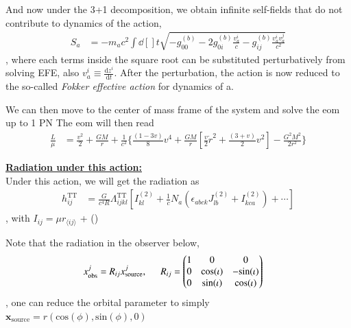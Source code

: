 \documentclass[a4paper, 12pt]{article}
\begin{document}
    And now under the 3+1 decomposition, we obtain infinite self-fields
    that do not contribute to dynamics of the action, 
    \begin{align}
      \label{dynamics of action}
      S_a &= - m_a c^{2} \int \dd[]{t} \sqrt{- g_{00}^{(b)} - 2
      g_{0i}^{(b)} \frac{v_{a}^{i}}{c} - g_{ij}^{(b)}
      \frac{v_{a}^{i} v_{a}^{j}}{c^2}}  
    \end{align}, where each terms inside the square root can be
    substituted 
    perturbatively from solving EFE, also \( v_{a}^{i} \equiv
    \frac{\mathrm{d}z^{i} }{\mathrm{d}t} \). 
    After the perturbation, the action is now reduced to the so-called
    \textit{Fokker effective action} for dynamics of a.
   
   We can then move to the center of mass frame of the system and solve
   the eom up to 1 PN 
   The eom will then read 
   \begin{align}
    \label{eom with fokker effective action}
    \frac{L}{\mu} &=  \frac{v^2}{2} + \frac{GM}{r} +
     \frac{1}{c^2} \bigg\{ \frac{(1-3v)}{8}v^4 + \frac{GM}{r}
     [\frac{v}{2} \dot{r}^{2} + \frac{(3+v)}{2}v^2 ] -
     \frac{G^2 M^2}{2 r^2}  \bigg\} 
   \end{align}

   \textbf{\underline{Radiation under this action:}}\\
   Under this action, we will get the radiation as 
   \begin{align}
    \label{radiation under fokker}
    h_{ij}^{\mathrm{TT}} &= \frac{G}{c^4 R}
     \Lambda_{ijkl}^{\mathrm{TT}} [ I_{kl}^{(2)} + \frac{1}{c} N_{a} (
     \epsilon_{abck} J_{lb}^{(2)} + I_{kca}^{(2)} ) + \cdots ] 
   \end{align}, with \( I_{ij} = \mu r_{\langle ij \rangle} \) +
   () 

Note that the radiation in the observer below, 
\begin{align}
  \label{observer for fokker}
  x_{\mathrm{obs}}^{j} &= R_{ij} x_{\mathrm{source}}^{j}, \hspace{0.5cm}
  R_{ij} = \begin{pmatrix} 1&0&0 \\ 
          0&\mathrm{cos}(\iota)&-\mathrm{sin}(\iota) \\ 
          0&\mathrm{sin}(\iota)&\mathrm{cos}(\iota) \end{pmatrix}
\end{align},
one can reduce the orbital parameter to simply \(
\textbf{x}_{\mathrm{source}} = r(\mathrm{cos}(\phi),
\mathrm{sin}(\phi), 0  ) \)
\end{document}
